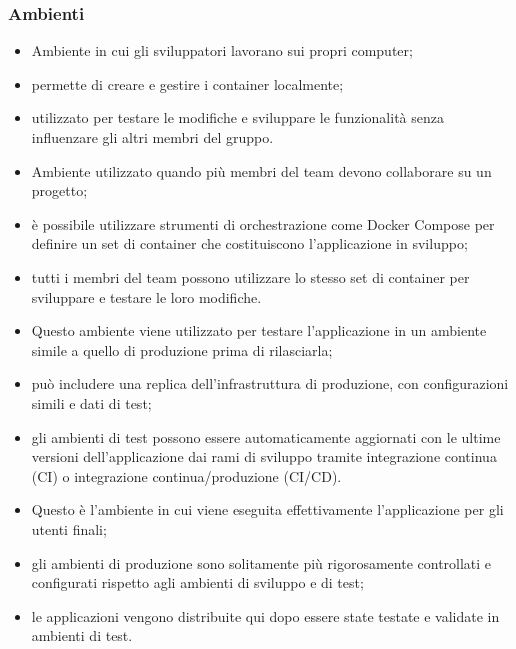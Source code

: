 \subsubsection{Ambienti}
\begin{itemize}
    \item Ambiente in cui gli sviluppatori lavorano sui propri computer;
    \item permette di creare e gestire i container localmente;
    \item utilizzato per testare le modifiche e sviluppare le funzionalità senza influenzare gli altri membri del gruppo.
\end{itemize}
\begin{itemize}
    \item Ambiente utilizzato quando più membri del team devono collaborare su un progetto;
    \item è possibile utilizzare strumenti di orchestrazione come Docker Compose per definire un set di container che costituiscono l'applicazione in sviluppo;
    \item tutti i membri del team possono utilizzare lo stesso set di container per sviluppare e testare le loro modifiche.
\end{itemize}
\begin{itemize}
    \item Questo ambiente viene utilizzato per testare l'applicazione in un ambiente simile a quello di produzione prima di rilasciarla;
    \item può includere una replica dell'infrastruttura di produzione, con configurazioni simili e dati di test;
    \item gli ambienti di test possono essere automaticamente aggiornati con le ultime versioni dell'applicazione dai rami di sviluppo tramite integrazione continua (CI) o integrazione continua/produzione (CI/CD).
\end{itemize}
\begin{itemize}
    \item Questo è l'ambiente in cui viene eseguita effettivamente l'applicazione per gli utenti finali;
    \item gli ambienti di produzione sono solitamente più rigorosamente controllati e configurati rispetto agli ambienti di sviluppo e di test;
    \item le applicazioni vengono distribuite qui dopo essere state testate e validate in ambienti di test.
\end{itemize}
